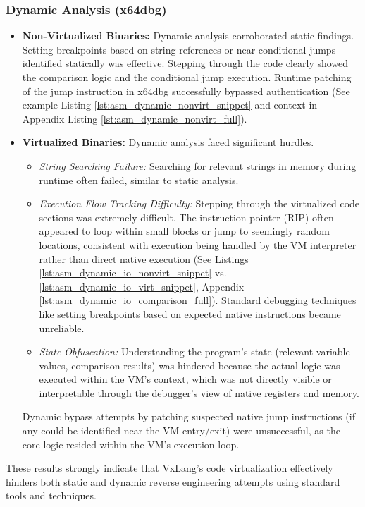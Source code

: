 \subsubsection{Dynamic Analysis (x64dbg)}
\begin{itemize}
    \item \textbf{Non-Virtualized Binaries:} Dynamic analysis corroborated static findings. Setting breakpoints based on string references or near conditional jumps identified statically was effective. Stepping through the code clearly showed the comparison logic and the conditional jump execution. Runtime patching of the jump instruction in x64dbg successfully bypassed authentication (See example Listing \ref{lst:asm_dynamic_nonvirt_snippet} and context in Appendix Listing \ref{lst:asm_dynamic_nonvirt_full}).
    \item \textbf{Virtualized Binaries:} Dynamic analysis faced significant hurdles.
        \begin{itemize}
            \item \textit{String Searching Failure:} Searching for relevant strings in memory during runtime often failed, similar to static analysis.
            \item \textit{Execution Flow Tracking Difficulty:} Stepping through the virtualized code sections was extremely difficult. The instruction pointer (RIP) often appeared to loop within small blocks or jump to seemingly random locations, consistent with execution being handled by the VM interpreter rather than direct native execution (See Listings \ref{lst:asm_dynamic_io_nonvirt_snippet} vs. \ref{lst:asm_dynamic_io_virt_snippet}, Appendix \ref{lst:asm_dynamic_io_comparison_full}). Standard debugging techniques like setting breakpoints based on expected native instructions became unreliable.
            \item \textit{State Obfuscation:} Understanding the program's state (relevant variable values, comparison results) was hindered because the actual logic was executed within the VM's context, which was not directly visible or interpretable through the debugger's view of native registers and memory.
        \end{itemize}
    Dynamic bypass attempts by patching suspected native jump instructions (if any could be identified near the VM entry/exit) were unsuccessful, as the core logic resided within the VM's execution loop.
\end{itemize}

These results strongly indicate that VxLang's code virtualization effectively hinders both static and dynamic reverse engineering attempts using standard tools and techniques.

